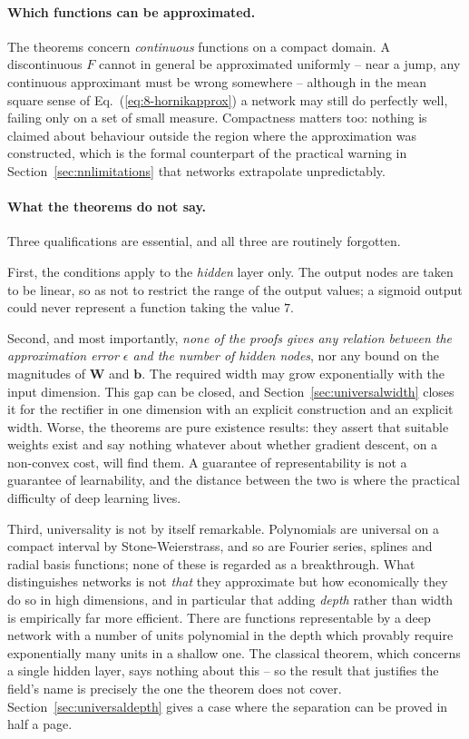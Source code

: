 \paragraph{Which functions can be approximated.}
The theorems concern \emph{continuous} functions on a compact domain.  A
discontinuous $F$ cannot in general be approximated uniformly -- near a jump,
any continuous approximant must be wrong somewhere -- although in the mean
square sense of Eq.~(\ref{eq:8-hornikapprox}) a network may still do perfectly
well, failing only on a set of small measure.  Compactness matters too: nothing
is claimed about behaviour outside the region where the approximation was
constructed, which is the formal counterpart of the practical warning in
Section~\ref{sec:nnlimitations} that networks extrapolate unpredictably.

\paragraph{What the theorems do not say.}
Three qualifications are essential, and all three are routinely forgotten.

First, the conditions apply to the \emph{hidden} layer only.  The output nodes
are taken to be linear, so as not to restrict the range of the output values; a
sigmoid output could never represent a function taking the value $7$.

Second, and most importantly, \emph{none of the proofs gives any relation
between the approximation error $\epsilon$ and the number of hidden nodes},
nor any bound on the magnitudes of $\bm{W}$ and $\bm{b}$.  The required width
may grow exponentially with the input dimension.  This gap can be closed, and
Section~\ref{sec:universalwidth} closes it for the rectifier in one dimension
with an explicit construction and an explicit width.  Worse, the theorems are pure
existence results: they assert that suitable weights exist and say nothing
whatever about whether gradient descent, on a non-convex cost, will find them.
A guarantee of representability is not a guarantee of learnability, and the
distance between the two is where the practical difficulty of deep learning
lives.

Third, universality is not by itself remarkable.  Polynomials are universal on
a compact interval by Stone-Weierstrass, and so are Fourier series, splines and
radial basis functions; none of these is regarded as a breakthrough.  What
distinguishes networks is not \emph{that} they approximate but how economically
they do so in high dimensions, and in particular that adding \emph{depth}
rather than width is empirically far more efficient.  There are functions
representable by a deep network with a number of units polynomial in the depth
which provably require exponentially many units in a shallow one.  The
classical theorem, which concerns a single hidden layer, says nothing about
this -- so the result that justifies the field's name is precisely the one the
theorem does not cover.  Section~\ref{sec:universaldepth} gives a case where
the separation can be proved in half a page.

